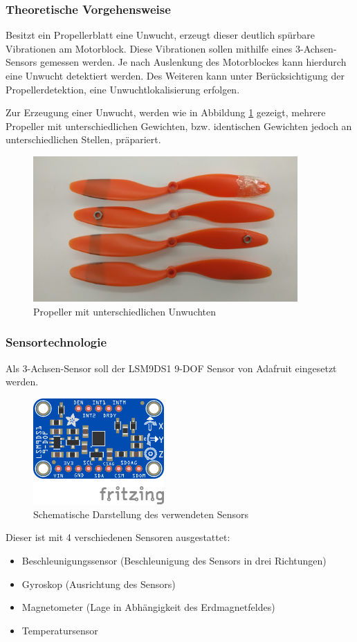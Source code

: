 \subsubsection*{Theoretische Vorgehensweise}
Besitzt ein Propellerblatt eine Unwucht, erzeugt dieser deutlich spürbare Vibrationen am Motorblock.
Diese Vibrationen sollen mithilfe eines 3-Achsen-Sensors gemessen werden.
Je nach Auslenkung des Motorblockes kann hierdurch eine Unwucht detektiert werden.
Des Weiteren kann unter Berücksichtigung der Propellerdetektion, eine Unwuchtlokalisierung erfolgen. 

Zur Erzeugung einer Unwucht, werden wie in Abbildung \ref{fig:propeller-mit-unwucht} gezeigt, mehrere Propeller mit unterschiedlichen Gewichten, bzw. identischen Gewichten jedoch an unterschiedlichen Stellen, präpariert.
\begin{figure}[H]
	\centering
	\includegraphics[width=0.9\textwidth]{images/chapter/03/propeller-mit-unwucht.png}
	\caption{Propeller mit unterschiedlichen Unwuchten}
	\label{fig:propeller-mit-unwucht}
\end{figure}

\subsubsection*{Sensortechnologie}
\label{subsec:unwucht_sensor}
Als 3-Achsen-Sensor soll der LSM9DS1 9-DOF Sensor von Adafruit eingesetzt werden.
\begin{figure}[H]
	\centering
	\includegraphics[width=5cm]{images/chapter/03/9-dof.png}
	\caption{Schematische Darstellung des verwendeten Sensors}
\end{figure}
Dieser ist mit 4 verschiedenen Sensoren ausgestattet:
\begin{itemize}
	\item Beschleunigungssensor (Beschleunigung des Sensors in drei Richtungen)
	\item Gyroskop (Ausrichtung des Sensors)
	\item Magnetometer (Lage in Abhängigkeit des Erdmagnetfeldes)
	\item Temperatursensor
\end{itemize}

